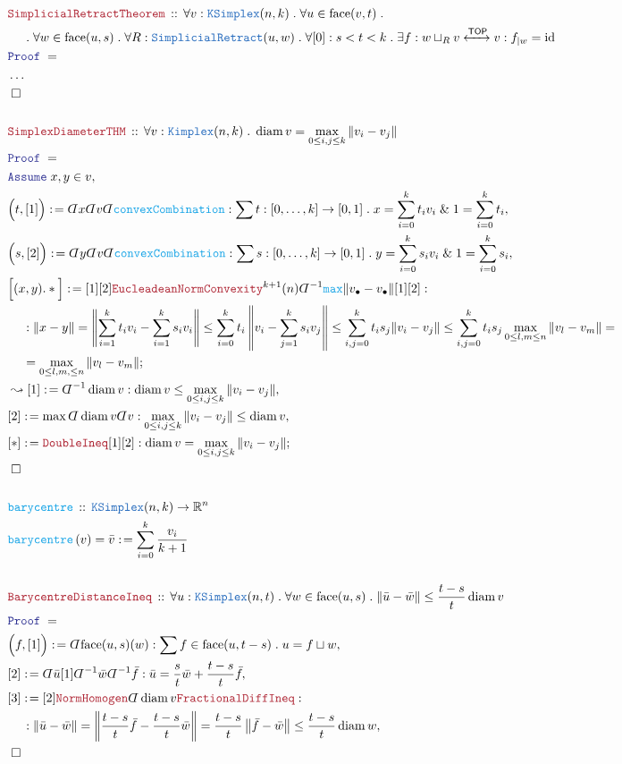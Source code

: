 \documentclass[12pt]{scrartcl}
\newcommand{\TYPE}[1]{\textcolor{NavyBlue}{\mathtt{#1}}}
\newcommand{\FUNC}[1]{\textcolor{Cerulean}{\mathtt{#1}}}
\newcommand{\LOGIC}[1]{\textcolor{Blue}{\mathtt{#1}}}
\newcommand{\THM}[1]{\textcolor{Maroon}{\mathtt{#1}}}
\renewcommand{\.}{\; . \;}
\newcommand{\de}{: \kern 0.1pc =}
\newcommand{\Act}[1]{\left( #1 \right)}
\newcommand{\Theorem}[2]{& \THM{#1} \, :: \, #2 \\ & \Proof = \\ }
\newcommand{\DeclareFunc}[2]{& \FUNC{#1} \, :: \, #2 \\}
\newcommand{\DefineNamedFunc}[4]{&  \FUNC{#1}\Act{#2} = #3 \de #4 \\}
\newcommand{\NewLine}{\\ & \kern 1pc}
\newcommand{\Page}[1]{ \begin{align*} #1 \end{align*}   }
\newcommand{ \bd }{ \ByDef }
\newcommand{\NoProof}{ & \ldots \\ \EndProof}
\renewcommand{\And}{\; \& \;}
\newcommand{\Reals}{\mathbb{R} }
\DeclareMathOperator*{\id}{id}
\newcommand{\ToIso}{\xleftrightarrow}
\newcommand{\Say}[3]{& #1 \de #2 : #3, \\}
\newcommand{\Conclude}[3]{& #1 \de #2 : #3; \\}
\newcommand{\Derive}[3]{& \leadsto #1 \de #2 : #3, \\}
\newcommand{\AssumeIn}[2]{& \LOGIC{Assume} \; #1 \in #2, \\}
\newcommand{\QED}{\; \square}
\newcommand{\EndProof}{& \QED \\}
\newcommand{\ByDef}{\rotatebox[origin=c]{-180}{$D$}}%
\newcommand{\Proof}{\LOGIC{Proof} \; }
\newcommand{\TOP}{\mathsf{TOP}}
\DeclareMathOperator{\diam}{diam}
\begin{document}
\Page{
	\Theorem{SimplicialRetractTheorem}
	{
		\forall v : \TYPE{KSimplex}(n,k) \.
		\forall u \in \mathrm{face}(v,t) \. \NewLine \.
		\forall w \in \mathrm{face}(u,s) \.
		\forall R : \TYPE{SimplicialRetract}(u,w) \.
		\forall [0] :  s < t < k \.
		\exists f : w \sqcup_{R} v \ToIso{\TOP} v:
		f_{|w} = \id
	}
	\NoProof
	\\
	\Theorem{SimplexDiameterTHM}
	{
		\forall v : \TYPE{Kimplex}(n,k) \.
		\diam v = \max_{0 \le i,j \le k} \| v_i - v_j\|
	}
	\AssumeIn{x,y}{v}
	\Say{\Big( t, [1] \Big)}{\bd x \bd v \bd \FUNC{convexCombination}}
	{
		\sum t : [0,\ldots,k] \to [0,1] \. x = \sum^k_{i=0} t_i v_i
		\And
		1 = \sum^k_{i=0} t_i 
	}
	\Say{\Big( s, [2] \Big)}{\bd y \bd v \bd \FUNC{convexCombination}}
	{
		\sum s : [0,\ldots,k] \to [0,1] \. y = \sum^k_{i=0} s_i v_i \And 1 = \sum^k_{i=0} s_i 
	}
	\Conclude{\Big[(x,y).*\Big]}{ 
		[1][2] 
		\THM{EucleadeanNormConvexity}^{k+1}(n) 
		\bd^{-1}\FUNC{max}\| v_\bullet - v_\bullet \|  
		[1][2]
	}
	{
		\NewLine :
		\| x - y\| =
		\left\| \sum^k_{i=1} t_i v_i  - \sum^k_{i=1} s_i v_i  \right\| \le
		\sum^k_{i=0} t_i \left\|  v_i - \sum^k_{j=1} s_i v_j \right\| \le
		\sum^k_{i,j = 0} t_i s_j \| v_i - v_j \| \le
		\sum^k_{i,j = 0} t_i s_j \max_{0 \le l,m \le n} \| v_l - v_m \| =
		\NewLine = 
		\max_{0 \le l,m, \le n} \| v_l - v_m \|
	}
	\Derive{[1]}{\bd^{-1} \diam v}{ \diam v \le \max_{0 \le i,j \le k} \| v_i - v_j\|}
	\Say{[2]}{ \max \bd \diam v \bd v}{\max_{0 \le i,j \le k} \| v_i - v_j \| \le \diam v}
	\Conclude{[*]}{\THM{DoubleIneq}[1][2]}{ \diam v = \max_{0 \le i,j \le k} \|v_i - v_j \|  }
	\EndProof
	\\
	\DeclareFunc{barycentre}{\TYPE{KSimplex}(n,k) \to \Reals^n}
	\DefineNamedFunc{barycentre}{v}{\bar v}{ \sum^k_{i=0} \frac{v_i}{k+1}}
	\\
	\Theorem{BarycentreDistanceIneq}
	{
		\forall u : \TYPE{KSimplex}(n,t) \.
		\forall w \in \mathrm{face}(u,s) \.
		\| \bar u - \bar w \|  \le \frac{t-s}{t} \diam v
	}
	\Say{\Big(f,[1]\Big)}{\bd \mathrm{face}(u,s)(w)}
	{
		\sum f \in \mathrm{face}(u,t-s) \. u = f \sqcup w
	}
	\Say{[2]}{\bd \bar u [1] \bd^{-1} \bar w \bd^{-1} \bar f}
	{
		\bar u =  \frac{s}{t} \bar w + \frac{t- s}{t} \bar f
	}
	\Say{[3]}{ [2] \THM{NormHomogen} \bd \diam v \THM{FractionalDiffIneq}  }
	{
		\NewLine : 
		\| \bar u - \bar w  \| = 
		\left\| \frac{t-s}{t} \bar f - \frac{t-s}{t} \bar w \right\| =
		\frac{t-s}{t} \left\| \bar f - \bar w \right\| \le  
		\frac{t-s}{t} \diam w 
	}
	\EndProof
}
\end{document}
